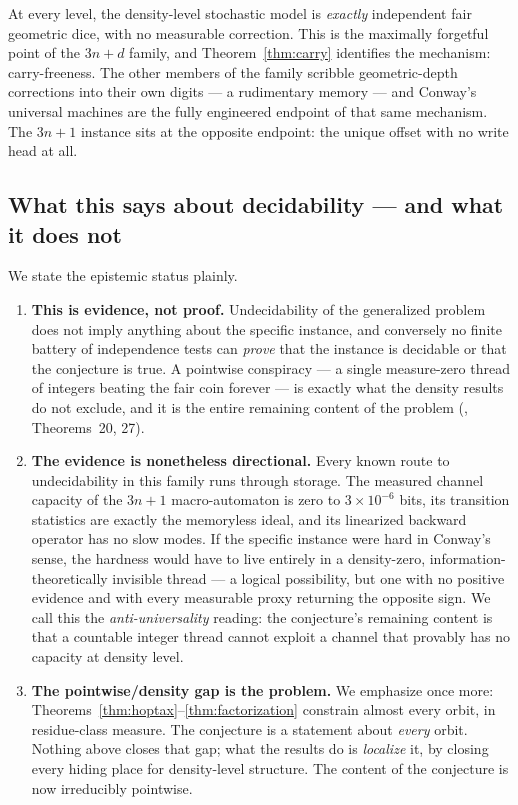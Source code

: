\documentclass[11pt]{article}
\theoremstyle{definition}
\begin{document}
At every level, the density-level stochastic model is \emph{exactly} independent fair
geometric dice, with no measurable correction. This is the maximally forgetful point of
the $3n+d$ family, and Theorem~\ref{thm:carry} identifies the mechanism: carry-freeness.
The other members of the family scribble geometric-depth corrections into their own
digits --- a rudimentary memory --- and Conway's universal machines are the fully
engineered endpoint of that same mechanism. The $3n+1$ instance sits at the opposite
endpoint: the unique offset with no write head at all.

\subsection{What this says about decidability --- and what it does not}

We state the epistemic status plainly.

\begin{enumerate}[label=(\arabic*)]
\item \textbf{This is evidence, not proof.} Undecidability of the generalized problem
\cite{Conway1972, KurtzSimon2007} does not imply anything about the specific instance,
and conversely no finite battery of independence tests can \emph{prove} that the
instance is decidable or that the conjecture is true. A pointwise conspiracy ---
a single measure-zero thread of integers beating the fair coin forever --- is exactly
what the density results do not exclude, and it is the entire remaining content of the
problem (\cite{Note2026}, Theorems~20, 27).
\item \textbf{The evidence is nonetheless directional.} Every known route to
undecidability in this family runs through storage. The measured channel capacity of
the $3n+1$ macro-automaton is zero to $3 \times 10^{-6}$ bits, its transition
statistics are exactly the memoryless ideal, and its linearized backward operator has
no slow modes. If the specific instance were hard in Conway's sense, the hardness would
have to live entirely in a density-zero, information-theoretically invisible thread ---
a logical possibility, but one with no positive evidence and with every measurable
proxy returning the opposite sign. We call this the \emph{anti-universality} reading:
the conjecture's remaining content is that a countable integer thread cannot exploit a
channel that provably has no capacity at density level.
\item \textbf{The pointwise/density gap is the problem.} We emphasize once more:
Theorems~\ref{thm:hoptax}--\ref{thm:factorization} constrain almost every orbit, in
residue-class measure. The conjecture is a statement about \emph{every} orbit. Nothing
above closes that gap; what the results do is \emph{localize} it, by closing every
hiding place for density-level structure. The content of the conjecture is now
irreducibly pointwise.
\end{enumerate}
\end{document}
